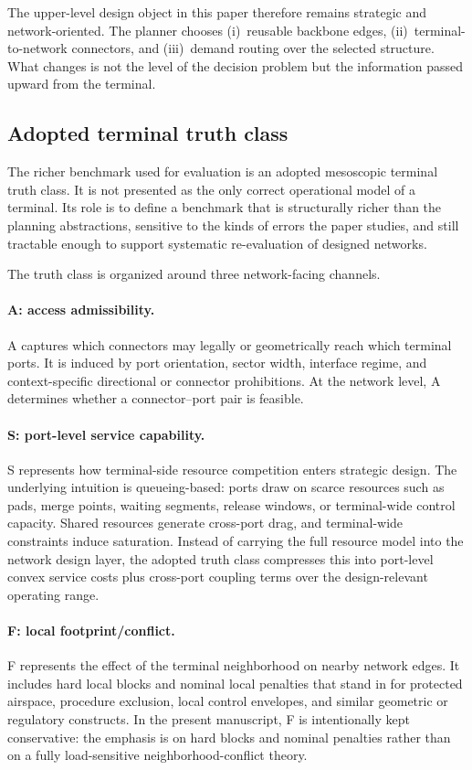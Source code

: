 \documentclass[review,authoryear]{elsarticle}
\begin{document}
The upper-level design object in this paper therefore remains strategic and network-oriented. The planner chooses (i)~reusable backbone edges, (ii)~terminal-to-network connectors, and (iii)~demand routing over the selected structure. What changes is not the level of the decision problem but the information passed upward from the terminal.

\subsection{Adopted terminal truth class}
\label{sec:problem:truth}

The richer benchmark used for evaluation is an adopted mesoscopic terminal truth class. It is not presented as the only correct operational model of a terminal. Its role is to define a benchmark that is structurally richer than the planning abstractions, sensitive to the kinds of errors the paper studies, and still tractable enough to support systematic re-evaluation of designed networks.

The truth class is organized around three network-facing channels.

\paragraph{A: access admissibility.}
A captures which connectors may legally or geometrically reach which terminal ports. It is induced by port orientation, sector width, interface regime, and context-specific directional or connector prohibitions. At the network level, A determines whether a connector--port pair is feasible.

\paragraph{S: port-level service capability.}
S represents how terminal-side resource competition enters strategic design. The underlying intuition is queueing-based: ports draw on scarce resources such as pads, merge points, waiting segments, release windows, or terminal-wide control capacity. Shared resources generate cross-port drag, and terminal-wide constraints induce saturation. Instead of carrying the full resource model into the network design layer, the adopted truth class compresses this into port-level convex service costs plus cross-port coupling terms over the design-relevant operating range.

\paragraph{F: local footprint/conflict.}
F represents the effect of the terminal neighborhood on nearby network edges. It includes hard local blocks and nominal local penalties that stand in for protected airspace, procedure exclusion, local control envelopes, and similar geometric or regulatory constructs. In the present manuscript, F is intentionally kept conservative: the emphasis is on hard blocks and nominal penalties rather than on a fully load-sensitive neighborhood-conflict theory.
\end{document}
